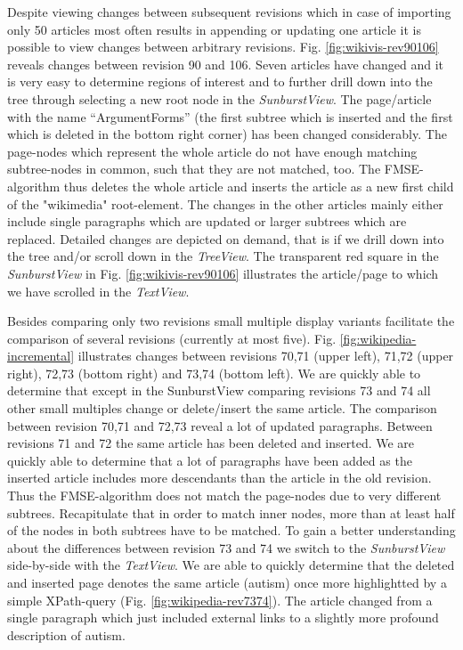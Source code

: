 Despite viewing changes between subsequent revisions which in case of importing only 50 articles most often results in appending or updating one article it is possible to view changes between arbitrary revisions. Fig. \ref{fig:wikivis-rev90106} reveals changes between revision 90 and 106. Seven articles have changed and it is very easy to determine regions of interest and to further drill down into the tree through selecting a new root node in the \emph{SunburstView}. The page/article with the name ``ArgumentForms'' (the first subtree which is inserted and the first which is deleted in the bottom right corner) has been changed considerably. The page-nodes which represent the whole article do not have enough matching subtree-nodes in common, such that they are not matched, too. The FMSE-algorithm thus deletes the whole article and inserts the article as a new first child of the "wikimedia" root-element. The changes in the other articles mainly either include single paragraphs which are updated or larger subtrees which are replaced. Detailed changes are depicted on demand, that is if we drill down into the tree and/or scroll down in the \emph{TreeView}. The transparent red square in the \emph{SunburstView} in Fig. \ref{fig:wikivis-rev90106} illustrates the article/page to which we have scrolled in the \emph{TextView}.

Besides comparing only two revisions small multiple display variants facilitate the comparison of several revisions (currently at most five). Fig. \ref{fig:wikipedia-incremental} illustrates changes between revisions 70,71 (upper left), 71,72 (upper right), 72,73 (bottom right) and 73,74 (bottom left). We are quickly able to determine that except in the SunburstView comparing revisions 73 and 74 all other small multiples change or delete/insert the same article. The comparison between revision 70,71 and 72,73 reveal a lot of updated paragraphs. Between revisions 71 and 72 the same article has been deleted and inserted. We are quickly able to determine that a lot of paragraphs have been added as the inserted article includes more descendants than the article in the old revision. Thus the FMSE-algorithm does not match the page-nodes due to very different subtrees. Recapitulate that in order to match inner nodes, more than at least half of the nodes in both subtrees have to be matched. To gain a better understanding about the differences between revision 73 and 74 we switch to the \emph{SunburstView} side-by-side with the \emph{TextView}. We are able to quickly determine that the deleted and inserted page denotes the same article (autism) once more highlightted by a simple XPath-query (Fig. \ref{fig:wikipedia-rev7374}). The article changed from a single paragraph which just included external links to a slightly more profound description of autism.

